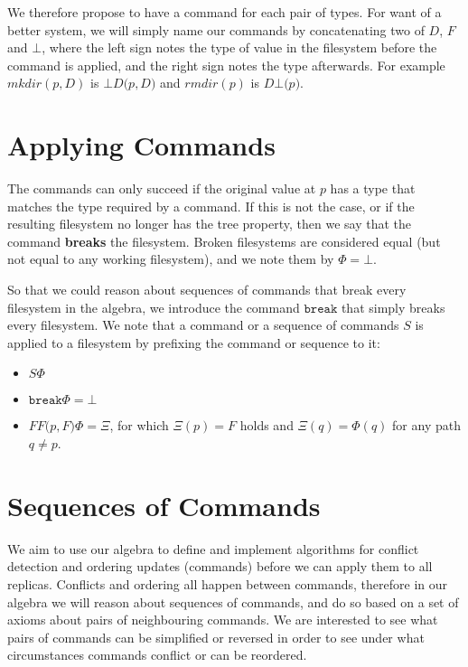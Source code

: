 \documentclass[12pt]{article}
\newcommand{\empt}{\bot}
\newcommand{\FS}{\Phi} %
\newcommand{\GS}{\Xi} %
\newcommand{\cbrk}{\mathtt{break}}
\newcommand{\fscommand}[2]{{#1#2}}
\newcommand{\cbd}{\fscommand{\empt{D}}}
\newcommand{\cff}{\fscommand{FF}}
\newcommand{\cdb}{\fscommand{D\empt}}
\begin{document}
We therefore propose to have a command for each pair of types.
For want of a better system, we will simply name our commands by concatenating
two of $\fscommand{D}{}$, $\fscommand{F}{}$ and $\fscommand{\empt}{}$, 
where the left sign notes the type of value
in the filesystem before the command is applied, and the right sign notes the type
afterwards. For example $mkdir(p,D)$ is $\cbd(p,D)$ and $rmdir(p)$ is $\cdb(p)$.


\section{Applying Commands}

The commands can only succeed if the original value at $p$ has a type that matches
the type required by a command. If this is not the case, or if the resulting
filesystem no longer has the tree property, then we say that the command
\textbf{breaks} the filesystem. Broken filesystems are considered equal
(but not equal to any working filesystem), and we note them by $\FS=\empt$.

So that we could reason about sequences of commands that break every filesystem
in the algebra, we introduce the command $\cbrk$ that simply breaks every filesystem.
We note that a command or a sequence of commands $S$ is applied to a filesystem
by prefixing the command or sequence to it:
\begin{itemize}
\item $S\FS$
\item $\cbrk\FS=\empt$
\item $\cff(p,F)\FS = \GS$, for which $\GS(p)=F$ holds
and $\GS(q)=\FS(q)$ for any path $q\neq p$.
\end{itemize}

\section{Sequences of Commands}

We aim to use our algebra to define and implement algorithms for conflict detection
and ordering updates (commands) before we can apply them to all replicas.
Conflicts and ordering all happen between commands, therefore in our algebra
we will reason about sequences of commands, 
and do so based on a set of axioms about pairs of neighbouring commands.
We are interested to see what pairs of commands can be simplified or reversed
in order to see under what circumstances commands conflict or can be reordered.
\end{document}
